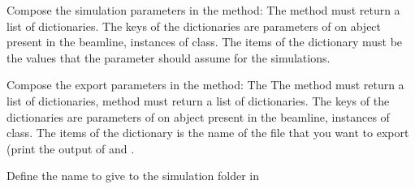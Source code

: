 \documentclass[letterpaper,10pt,english]{sphinxmanual}
\begin{document}
\sphinxAtStartPar
Compose the simulation parameters in the  method:
The  method must return a list of dictionaries.
The keys of the dictionaries are parameters of on abject
present in the beamline, instances of  class.
The items of the dictionary must be the values that the parameter should
assume for the simulations.

\sphinxAtStartPar
Compose the export parameters in the  method:
The The  method must return a list of dictionaries,
method must return a list of dictionaries.
The keys of the dictionaries are parameters of on abject
present in the beamline, instances of  class.
The items of the dictionary is the name of the file that you want to export
(print the output of  and
.

\sphinxAtStartPar
Define the name to give to the simulation folder
in 

\begin{sphinxVerbatim}[commandchars=\\\{\}]
   

  

 
     

     

          \PYG{p}{[}\PYG{p}{]}

         

     

          \PYG{p}{[}\PYG{p}{]}

         

     

          

         
\end{sphinxVerbatim}
\end{document}
